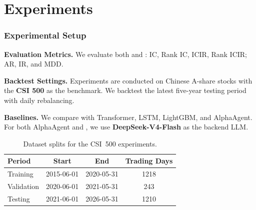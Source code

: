 
\section{Experiments}

\begin{frame}
\frametitle{Experimental Setup}

\small
\textbf{Evaluation Metrics.}
We evaluate both  and :
IC, Rank IC, ICIR, Rank ICIR; AR, IR, and MDD.

\vspace{0.45em}
\textbf{Backtest Settings.}
Experiments are conducted on Chinese A-share stocks with the \textbf{CSI 500}
as the benchmark. We backtest the latest five-year testing period with
\alert{daily rebalancing}.

\vspace{0.45em}
\textbf{Baselines.}
We compare \prjname{} with Transformer, LSTM, LightGBM, and AlphaAgent.
For both AlphaAgent and \prjname{}, we use \textbf{DeepSeek-V4-Flash} as the
backend LLM.

\vspace{0.6em}
\begin{table}
\centering
\footnotesize
\setlength{\tabcolsep}{7pt}
\begin{tabular}{lccc}
\toprule
\textbf{Period} & \textbf{Start} & \textbf{End} & \textbf{Trading Days} \\
\midrule
Training   & 2015-06-01 & 2020-05-31 & 1218 \\
Validation & 2020-06-01 & 2021-05-31 & 243  \\
Testing    & 2021-06-01 & 2026-05-31 & 1210 \\
\bottomrule
\end{tabular}
\caption{Dataset splits for the CSI~500 experiments.}
\end{table}
\end{frame}

